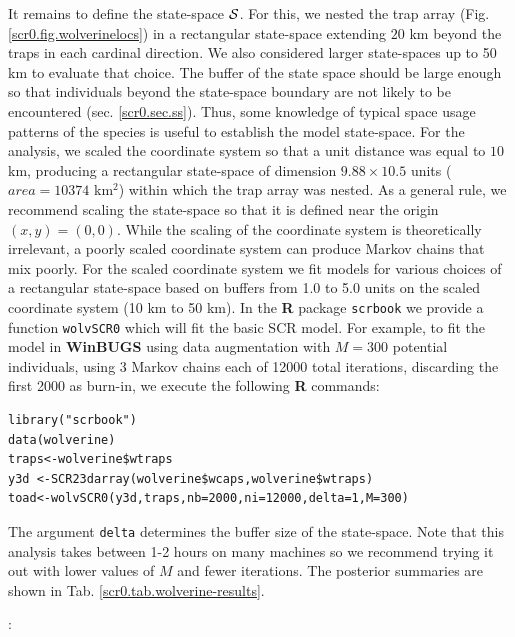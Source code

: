 {It remains to define the
state-space ${\cal S}$. For this, we nested the trap array (Fig.
\ref{scr0.fig.wolverinelocs}) in a
 rectangular state-space extending $20$ km beyond the traps in each cardinal
direction.  We also considered larger state-spaces up to 50 km to
evaluate that choice.  The buffer of the state space should be large
enough so that individuals beyond the state-space boundary are not
likely to be encountered
(sec. \ref{scr0.sec.ss}).
Thus, some knowledge of typical space usage
patterns of the species is useful to establish the model state-space.  For the analysis, 
we scaled the coordinate system 
so that a unit distance was equal to $10$ km, producing a rectangular
state-space of dimension $9.88 \times 10.5$ units ($area = 10374$ km$^2$)
within which the trap array was nested. As a general rule, we
recommend scaling the state-space so that it is defined near the
origin $(x,y)=(0,0)$. While the scaling of the coordinate system is
theoretically irrelevant, a poorly scaled coordinate system can
produce Markov chains that mix poorly.  For the scaled coordinate
system we fit models for various choices of a rectangular state-space
based on 
buffers from 1.0 to 5.0 units on the scaled coordinate system (10 km to
50 km). In the {\bf R} package \mbox{\tt scrbook} we provide a
function
\mbox{\tt wolvSCR0} which will fit the basic SCR model. For
example, to fit the model in 
{\bf WinBUGS} using data augmentation with $M=300$ potential individuals,
using 3 Markov chains each of 12000 total iterations, discarding the
first 2000 as burn-in, we execute the following {\bf R} commands:
{\small
\begin{verbatim}
library("scrbook")
data(wolverine)
traps<-wolverine$wtraps
y3d <-SCR23darray(wolverine$wcaps,wolverine$wtraps)
toad<-wolvSCR0(y3d,traps,nb=2000,ni=12000,delta=1,M=300)
\end{verbatim}
}
The argument \mbox{\tt delta} determines the buffer size of the state-space.
Note that this analysis takes 
between 1-2 hours on many machines so we recommend trying it out with
lower values of $M$ and fewer iterations.
The posterior summaries are shown in 
Tab. \ref{scr0.tab.wolverine-results}.

:

}
